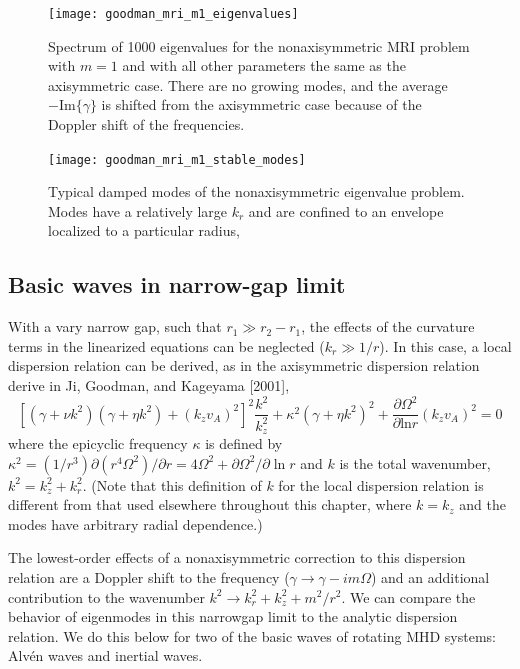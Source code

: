 \documentclass[letterpaper]{article}
\begin{document}
\begin{figure}
\centering
\texttt{[image: goodman\_mri\_m1\_eigenvalues]}
\caption[Eigenvalue spectrum for nonaxisymmetric MRI problem]{Spectrum
  of 1000 eigenvalues for the nonaxisymmetric MRI problem with $m=1$
  and with all other parameters the same as the axisymmetric
  case. There are no growing modes, and the average
  $-\mathrm{Im}\{\gamma\}$ is shifted from the axisymmetric case
  because of the Doppler shift of the frequencies.}
\label{fig:globalcode:goodman_mri_m1_eigenvalues}
\end{figure}

\begin{figure}
\centering
\texttt{[image: goodman\_mri\_m1\_stable\_modes]}
\caption[Damped eigenmodes of the nonaxisymmetric MRI problem]{Typical
  damped modes of the nonaxisymmetric eigenvalue problem. Modes have a
  relatively large $k_r$ and are confined to an envelope localized to
  a particular radius, }
\label{fig:globalcode:goodman_mri_m1_stable_modes}
\end{figure}



\subsection{Basic waves in narrow-gap limit}

With a vary narrow gap, such that $r_1 \gg r_2 - r_1$, the effects of
the curvature terms in the linearized equations can be neglected ($k_r
\gg 1/r$). In this case, a local dispersion relation can be derived, as
in the axisymmetric dispersion relation derive in Ji, Goodman, and
Kageyama [2001],
\begin{equation}
\left[(\gamma + \nu k^2)(\gamma + \eta k^2) 
      + (k_zv_A)^2\right]^2\frac{k^2}{k_z^2}
+ \kappa^2(\gamma + \eta k^2)^2
+ \frac{\partial \Omega^2}{\partial \mathrm{ln} r}(k_z v_A)^2 = 0
\end{equation}
where the epicyclic frequency $\kappa$ is defined by
$\kappa^2=(1/r^3)\partial(r^4\Omega^2)/\partial r = 4\Omega^2 +
\partial \Omega^2/\partial \ln r$ and $k$ is the total wavenumber,
$k^2 = k_z^2 + k_r^2$. (Note that this definition of $k$ for the local
dispersion relation is different from that used elsewhere throughout
this chapter, where $k=k_z$ and the modes have arbitrary radial
dependence.)

The lowest-order effects of a nonaxisymmetric correction to this
dispersion relation are a Doppler shift to the frequency ($\gamma
\rightarrow \gamma - im\Omega$) and an additional contribution to the
wavenumber $k^2 \rightarrow k_r^2 + k_z^2 + m^2/r^2$. We can compare the
behavior of eigenmodes in this narrowgap limit to the analytic
dispersion relation. We do this below for two of the basic waves of
rotating MHD systems: Alv\'en waves and inertial waves.
\end{document}
